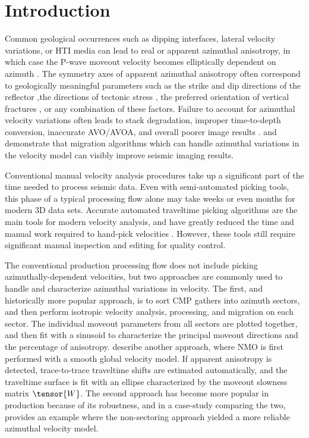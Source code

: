 \section{Introduction}
Common geological occurrences such as dipping interfaces, lateral velocity variations, or HTI media can lead to real or apparent azimuthal anisotropy, in which case the P-wave moveout velocity becomes elliptically dependent on azimuth \cite[]{GEO63-03-10791092}. The symmetry axes of apparent azimuthal anisotropy often correspond to geologically meaningful parameters such as the strike and dip directions of the reflector \cite[]{GEO50-11-20262032},the directions of tectonic stress \cite[]{sicking_nelan_mclain07}, the preferred orientation of vertical fractures \cite[]{crampin84}, or any combination of these factors. Failure to account for azimuthal velocity variations often leads to stack degradation, improper time-to-depth conversion, inaccurate AVO/AVOA, and overall poorer image results \cite[]{TLE21-08-07710774}.  \cite{sicking_nelan08} and \cite{treadgold_etal08} demonstrate that migration algorithms which can handle azimuthal variations in the velocity model can visibly improve seismic imaging results.

Conventional manual velocity analysis procedures take up a significant part of the time needed to process seismic data.  Even with semi-automated picking tools, this phase of a typical processing flow alone may take weeks or even months for modern 3D data sets.  Accurate automated traveltime picking algorithms are the main tools for modern velocity analysis, and have greatly reduced the time and manual work required to hand-pick velocities \cite[]{SEG-2003-20882091}.  However, these tools still require significant manual inspection and editing for quality control.  

The conventional production processing flow does not include picking azimuthally-dependent velocities, but two approaches are commonly used to handle and characterize azimuthal variations in velocity.  The first, and historically more popular approach, is to sort CMP gathers into azimuth sectors, and then perform isotropic velocity analysis, processing, and migration on each sector.  The individual moveout parameters from all sectors are plotted together, and then fit with a sinusoid to characterize the principal moveout directions and the percentage of anisotropy.  \cite{GPR47-02-01170148} describe another approach, where NMO is first performed with a smooth global velocity model.  If apparent anisotropy is detected, trace-to-trace traveltime shifts are estimated automatically, and the traveltime surface is fit with an ellipse characterized by the moveout slowness matrix $\tensor{W}$.  The second approach has become more popular in production because of its robustness, and in a case-study comparing the two, \cite{lynn07} provides an example where the non-sectoring approach yielded a more reliable azimuthal velocity model.  

